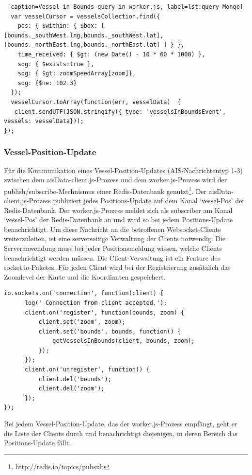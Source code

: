   \begin{lstlisting} [caption=Vessel-in-Bounds-query in worker.js, label=lst:query Mongo]
  var vesselCursor = vesselsCollection.find({
    pos: { $within: { $box: [ [bounds._southWest.lng,bounds._southWest.lat], [bounds._northEast.lng,bounds._northEast.lat] ] } },
    time_received: { $gt: (new Date() - 10 * 60 * 1000) },
    sog: { $exists:true },
    sog: { $gt: zoomSpeedArray[zoom]},
    sog: {$ne: 102.3}
  });
  vesselCursor.toArray(function(err, vesselData)  {
   client.sendUTF(JSON.stringify({ type: 'vesselsInBoundsEvent', vessels: vesselData}));
});
\end{lstlisting}

\subsubsection{Vessel-Position-Update}\label{Vessel-Position-Update}
Für die Kommunikation eines Vessel-Position-Updates (AIS-Nachrichtentyp 1-3) zwischen dem aisData-client.js-Prozess und dem worker.js-Prozess wird der publish/subscribe-Mechnismus einer Redis-Datenbank genutzt\footnote{http://redis.io/topics/pubsub}. Der aisData-client.js-Prozess publiziert jedes Positions-Update auf dem Kanal ‘vessel-Pos’ der Redis-Datenbank. Der worker.js-Prozess meldet sich als subscriber am Kanal ‘vessel-Pos’ der Redis-Datenbank an und wird so bei jedem Positions-Update benachrichtigt.
Um diese Nachricht an die betroffenen Websocket-Clients weiterzuleiten, ist eine serverseitige Verwaltung der Clients notwendig. Die Serveranwendung muss bei jeder Positionsmeldung wissen, welche Clients benachrichtigt werden müssen. Die Client-Verwaltung ist ein Feature des socket.io-Paketes. Für jeden Client wird bei der Registrierung zusätzlich das Zoomlevel der Karte und die Koordinaten gespeichert.
\begin{lstlisting}[caption= Speichern der übermittelten Client-Daten in worker.js, label=Speichern der übermittelten Client-Daten in worker.js]
io.sockets.on('connection', function(client) {
      log(' Connection from client accepted.');
      client.on('register', function(bounds, zoom) {
          client.set('zoom', zoom);
          client.set('bounds', bounds, function() {
              getVesselsInBounds(client, bounds, zoom);
          });
      });
      client.on('unregister', function() {
          client.del('bounds');
          client.del('zoom');
      });
});
  \end{lstlisting}
  Bei jedem Vessel-Position-Update, das der worker.js-Prozess empfängt, geht er die Liste der Clients durch und benachrichtigt diejenigen, in deren Bereich das Positions-Update fällt.
